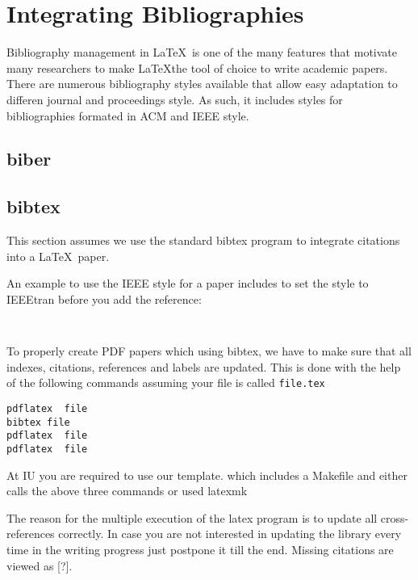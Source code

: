 \FILENAME

\section{Integrating Bibliographies}
\label{S:bibliographies}

Bibliography management in \LaTeX\ is one of the many features that
motivate many researchers to make \LaTeX the tool of choice to write
academic papers. There are numerous bibliography styles available that
allow easy adaptation to differen journal and proceedings style. As
such, it includes styles for bibliographies formated in ACM and IEEE
style.

\subsection{biber}


\subsection{bibtex}

This section assumes we use the standard bibtex program to integrate
citations into a \LaTeX\ paper.

An example to use the IEEE style for a paper includes to set
the style to IEEEtran before you add the reference:

\begin{verbatim}


\end{verbatim}

To properly create PDF papers which using bibtex, we have to make sure
that all indexes, citations, references and labels are updated. This
is done with the help of the following commands assuming your file is
called \verb|file.tex|

\begin{verbatim}
pdflatex  file
bibtex file
pdflatex  file
pdflatex  file
\end{verbatim}


\begin{IU}
At IU you are required to use our template. which includes a Makefile
and either calls the above three commands or used latexmk
\end{IU}

The reason for the multiple execution of the latex program is to update
all cross-references correctly. In case you are not interested in
updating the library every time in the writing progress just postpone it
till the end. Missing citations are viewed as {[}?{]}.

